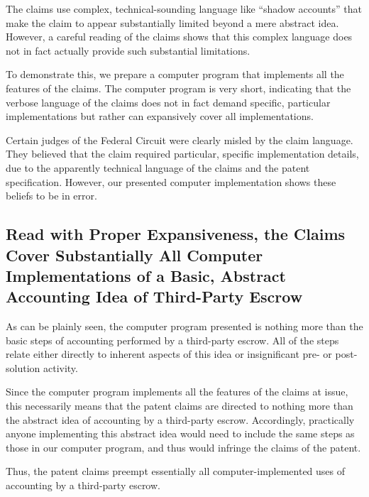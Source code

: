 \documentclass{scotus}
\def\basickeywordstyle{\addfontfeatures{Letters=UppercaseSmallCaps}}
\def\basickeywordstyle{\bfseries}
\begin{document}
The claims use complex, technical-sounding language like ``shadow accounts''
that make the claim to appear substantially limited beyond a mere abstract idea.
However, a careful reading of the claims shows that this complex language does
not in fact actually provide such substantial limitations.

To demonstrate this, we prepare a computer program that implements all the
features of the claims. The computer program is very short, indicating that the
verbose language of the claims does not in fact demand specific, particular
implementations but rather can expansively cover all implementations.

\begingroup
\lstset{keywordstyle=\basickeywordstyle,identifierstyle=\itshape}
\lstset{breaklines=true,showstringspaces=false}
\lstset{language=[Visual]Basic,columns=fullflexible}

\endgroup

Certain judges of the Federal Circuit were clearly misled by the claim language.
They believed that the claim required particular, specific implementation
details, due to the apparently technical language of the claims and the patent
specification. However, our presented computer implementation shows these
beliefs to be in error.

\subsection{Read with Proper Expansiveness, the Claims Cover Substantially All
Computer Implementations of a Basic, Abstract Accounting Idea of Third-Party
Escrow}

As can be plainly seen, the computer program presented is nothing more than the
basic steps of accounting performed by a third-party escrow. All of the steps
relate either directly to inherent aspects of this idea or insignificant pre- or
post-solution activity.

Since the computer program implements all the features of the claims at issue,
this necessarily means that the patent claims are directed to nothing more than
the abstract idea of accounting by a third-party escrow. Accordingly,
practically anyone implementing this abstract idea would need to include the
same steps as those in our computer program, and thus would infringe the claims
of the patent.

Thus, the patent claims preempt essentially all computer-implemented uses of
accounting by a third-party escrow.
\end{document}
